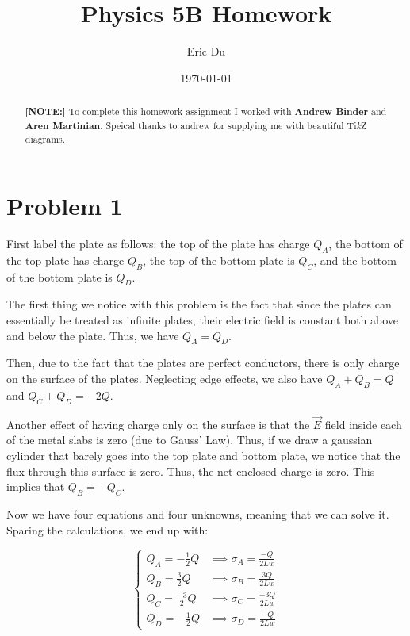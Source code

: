 \documentclass{article}
\title{Physics 5B Homework}
\author{Eric Du}
\date{\today}
\theoremstyle{definition}
\numberwithin{equation}{section}
\numberwithin{definition}{section}
\begin{document}
    \maketitle
    \begin{abstract}

        \noindent \textbf{[NOTE:]} To complete this homework assignment I worked with \textbf{Andrew Binder} and \textbf{Aren Martinian}. Speical thanks to andrew for supplying me with beautiful Ti\textit{k}Z diagrams.
    \end{abstract}
    \section{Problem 1}
    First label the plate as follows: the top of the plate has charge $Q_A$, the bottom of the top plate has charge $Q_B$, the top of the bottom plate is $Q_C$, and the bottom of the bottom plate is $Q_D$. 

    \medskip

    The first thing we notice with this problem is the fact that since the plates can essentially be treated as infinite plates, their electric field is constant both above and below the plate. Thus, we have $Q_A = Q_D$.

    \medskip

    Then, due to the fact that the plates are perfect conductors, there is only charge on the surface of the plates. Neglecting edge effects, we also have $Q_A + Q_B = Q$ and $Q_C + Q_D = -2Q$. 

    \medskip

    Another effect of having charge only on the surface is that the $\vec E$ field inside each of the metal slabs is zero (due to Gauss' Law). Thus, if we draw a gaussian cylinder that barely goes into the top plate and bottom plate, we notice that the flux through this surface is zero. Thus, the net enclosed charge is zero. This implies that $Q_B = -Q_C$. 
    
    \medskip

    Now we have four equations and four unknowns, meaning that we can solve it. Sparing the calculations, we end up with:

    \[ \begin{cases}
        Q_A = -\frac{1}{2}Q &\implies  \sigma_A = \frac{-Q}{2Lw}\\
        Q_B = \frac{3}{2} Q &\implies \sigma_B = \frac{3Q}{2Lw}\\
        Q_C = \frac{-3}{2}Q &\implies \sigma_C = \frac{-3Q}{2Lw}\\
        Q_D = -\frac{1}{2}Q &\implies \sigma_D = \frac{-Q}{2Lw}
    \end{cases} \]
    
\end{document}
